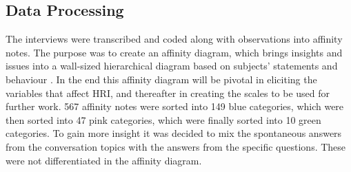 \subsection{Data Processing}
The interviews were transcribed and coded along with observations into affinity notes. The purpose was to create an affinity diagram, which brings insights and issues into a wall-sized hierarchical diagram based on subjects' statements and behaviour \cite{Wendell2005}. In the end this affinity diagram will be pivotal in eliciting the variables that affect HRI, and thereafter in creating the scales to be used for further work. 
567 affinity notes were sorted into 149 blue categories, which were then sorted into 47 pink categories, which were finally sorted into 10 green categories. To gain more insight it was decided to mix the spontaneous answers from the conversation topics with the answers from the specific questions. These were not differentiated in the affinity diagram.




%
%
